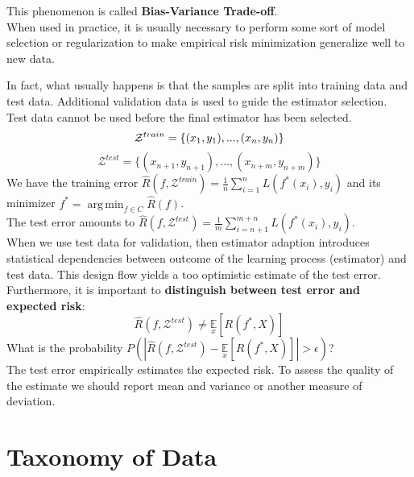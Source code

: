 \documentclass[twoside]{article}
\DeclareMathOperator*{\argmin}{arg\,min}
\begin{document}
This phenomenon is called \textbf{Bias-Variance Trade-off}.\\
When used in practice, it is usually necessary to perform some sort of model selection or regularization to make empirical risk minimization generalize well to new data.\medskip

In fact, what usually happens is that the samples are split into training data and test data. Additional validation data is used to guide the estimator selection.\\
Test data cannot be used before the final estimator has been selected.
\begin{equation*}
    \mathcal{Z}^{train} = \{(x_1, y_1),...,(x_n, y_n)\}\\
\end{equation*}
\begin{equation*}
    \mathcal{Z}^{test} = \{(x_{n+1}, y_{n+1}),...,(x_{n+m}, y_{n+m})\}
\end{equation*}
We have the training error $\hat{R}(f, \mathcal{Z}^{train}) = \frac{1}{n}\sum\limits_{i = 1}^{n}L(f^*(x_i), y_i)$ and its minimizer $f^* = \argmin_{f \in C} \hat{R}(f)$.\\
The test error amounts to $\hat{R}(f, \mathcal{Z}^{test}) = \frac{1}{m}\sum\limits_{i = n+1}^{m+n}L(f^*(x_i), y_i)$.\\
When we use test data for validation, then estimator adaption introduces statistical dependencies between outcome of the learning process (estimator) and test data. This design flow yields a too optimistic estimate of the test error.\\
Furthermore, it is important to \textbf{distinguish between test error and expected risk}:
\begin{equation*}
    \hat{R}(f, \mathcal{Z}^{test}) \neq \underset{x}{\mathbb{E}}[R(f^*, X)]
\end{equation*}
What is the probability $P(|\hat{R}(f, \mathcal{Z}^{test})-\underset{x}{\mathbb{E}}[R(f^*, X)]|> \epsilon)$?\\
The test error empirically estimates the expected risk. To assess the quality of the estimate we should report mean and variance or another measure of deviation.

\newpage

\section{Taxonomy of Data}
\end{document}
